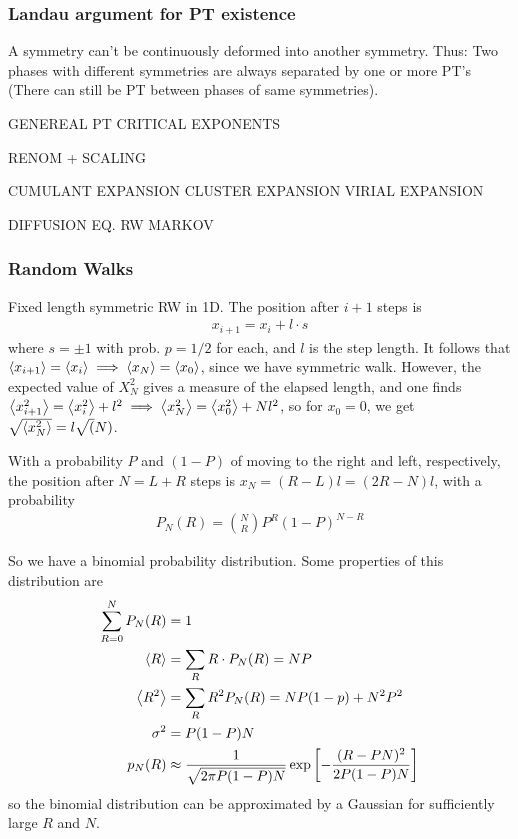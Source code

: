 \documentclass[a4paper, english, 12pt]{article}
\newcommand{\bracket}[1]{\left[ #1 \right]}
\begin{document}
\begin{multicols*}{2}
\subsubsection*{\tiny Landau argument for PT existence}
A symmetry can't be continuously deformed into another symmetry. Thus: Two phases with different symmetries are always separated by one or more PT's (There can still be PT between phases of same symmetries).




GENEREAL PT 
CRITICAL EXPONENTS 

RENOM + SCALING 


CUMULANT EXPANSION 
CLUSTER EXPANSION 
VIRIAL EXPANSION 


DIFFUSION EQ. RW
MARKOV 


\subsubsection*{\scriptsize Random Walks}

Fixed length symmetric RW in 1D. The position after $i+1$ steps is 
\begin{align*}
    x_{i+1} = x_i + l\cdot s 
\end{align*}
where $s=\pm1$ with prob. $p=1/2$ for each, and $l$ is the step length. It follows that $\expval{x_{i+1}}=\expval{x_i}\implies \expval{x_N}=\expval{x_0}$, since we have symmetric walk. However, the expected value of $X_N^2$ gives a measure of the elapsed length, and one finds $\expval{x_{i+1}^2}=\expval{x_i^2}+l^2 \implies \expval{x_N^2}=\expval{x_0^2}+Nl^2$, so for $x_0=0$, we get $\sqrt{\expval{x_N^2}}=l\sqrt(N)$. 

With a probability $P$ and $(1-P)$ of moving to the right and left, respectively, the position after $N=L+R$ steps is $x_N=(R-L)l = (2R-N)l$, with a probability 
\begin{align*}
    P_N(R) = \binom{N}{R} P^R (1-P)^{N-R}
\end{align*}

So we have a binomial probability distribution. Some properties of this distribution are  
\begin{align*}
    \sum_{R=0}^N P_N(R) &= 1 \\ 
    \expval{R} &= \sum_R R\cdot P_N(R)=NP \\ 
    \expval{R^2} &= \sum_R R^2 P_N(R) = NP(1-p) + N^2 P^2 \\
    \sigma^2 &= P(1-P)N \\ 
    p_N(R) &\approx \frac{1}{\sqrt{2\pi P(1-P)N}}\exp\bracket{-\frac{(R-PN)^2}{2P(1-P)N}}
\end{align*}
so the binomial distribution can be approximated by a Gaussian for sufficiently large $R$ and $N$. 


\end{multicols*}
\end{document}

